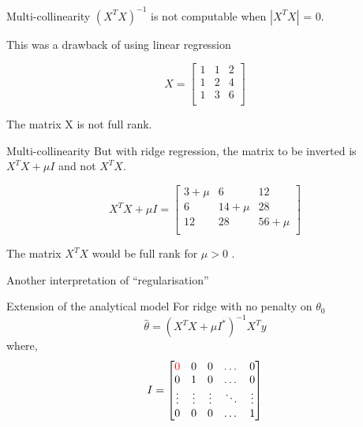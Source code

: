 \documentclass{beamer}
\begin{document}
\begin{frame}{Multi-collinearity}
$(X^{T}X)^{-1}$ is not computable when $|X^{T}X|$ = 0.

This was a drawback of using linear regression

\begin{equation*}
X = \begin{bmatrix}
1 & 1& 2\\
1 & 2& 4\\
1 & 3& 6\\
\end{bmatrix}
\end{equation*}

The matrix X is not full rank. 
\end{frame}

\begin{frame}{Multi-collinearity}
But with ridge regression, the matrix to be inverted is $X^{T}X + \mu I$ and not $X^{T}X$.

\begin{equation*}
X^TX + \mu I = \begin{bmatrix}
3+\mu & 6& 12\\
6 & 14+\mu & 28\\
12 & 28& 56+\mu \\
\end{bmatrix}
\end{equation*}

The matrix $X^TX$ would be full rank for $\mu>0$ . 

\pause Another interpretation of ``regularisation''
\end{frame}


\begin{frame}{Extension of the analytical model}
For ridge with no penalty on $\theta_0$
$$
\hat{\theta} = \left(X^TX+\mu I^*\right)^{-1}X^Ty
$$
where, $$I = \begin{bmatrix}
    \color{red}0 & 0 & 0 & \dots  & 0 \\
    0 & 1& 0 & \dots  & 0\\
    \vdots & \vdots & \vdots & \ddots & \vdots \\
    0 & 0 & 0 & \dots  & 1
\end{bmatrix}$$
\end{frame}


{
	
}


{
	
}
\end{document}
